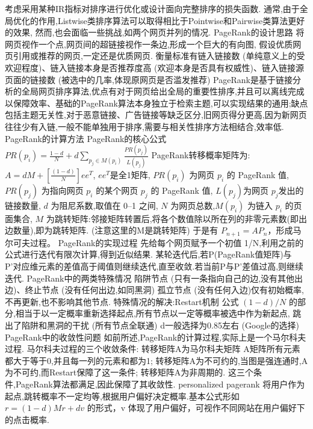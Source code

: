 \documentclass[10pt, utf8]{ctexart}
\begin{document}
\begin{multicols}{4}
    考虑采用某种IR指标对排序进行优化或设计面向完整排序的损失函数.
    通常,由于全局优化的作用,Listwise类排序算法可以取得相比于Pointwise和Pairwise类算法更好的效果,
    然而,也会面临一些挑战,如两个网页并列的情况.
    {\color{blue}PageRank的设计思路}
    将网页视作一个点,网页间的超链接视作一条边,形成一个巨大的有向图,
    假设优质网页引用或推荐的网页,一定还是优质网页.
    衡量标准有链入链接数 (单纯意义上的受欢迎程度)、链入链接本身是否推荐度高 (欢迎本身是否具有权威性)、链入链接源页面的链接数 (被选中的几率,体现原网页是否滥发推荐)
    PageRank是基于链接分析的全局网页排序算法,优点有对于网页给出全局的重要性排序,并且可以离线完成以保障效率、基础的PageRank算法本身独立于检索主题,可以实现结果的通用;缺点包括主题无关性,对于恶意链接、广告链接等缺乏区分,旧网页得分更高,因为新网页往往少有入链,一般不能单独用于排序,需要与相关性排序方法相结合,效率低.
    {\color{red}PageRank的计算方法}
    PageRank的核心公式
    {\tiny${PR}(p_{i})=\frac{1-d}{N}+d \sum_{p_{j} \in M(p_{i})} \frac{PR(p_{j})}{L(p_{j})}$}
    PageRank转移概率矩阵为:{\tiny$A =dM+\left[\frac{(1-d)}{N}\right]ee^{T}$}, $e e^{T}$是全1矩阵,
    $PR(p_i)$ 为网页 $p_i$ 的 PageRank 值,
    $PR(p_j)$ 为指向网页 $p_i$ 的某个网页 $p_j$ 的 PageRank 值,
    $L(p_j)$为网页 $p_j$发出的链接数量,
    $d$ 为阻尼系数,取值在 0--1 之间,
    $N$ 为网页总数,$M(p_i)$ 为链入 $p_i$ 的页面集合,
    $M$ 为跳转矩阵:邻接矩阵转置后,将各个数值除以所在列的非零元素数(即出边数量),即为跳转矩阵.
    ({\color{red}注意这里的M是跳转矩阵})
    于是有 $P_{n+1} = AP_n$，形成马尔可夫过程。
    {\color{blue}PageRank的实现过程}
    先给每个网页赋予一个初值 1/N,利用之前的公式进行迭代有限次计算,得到近似结果.
    某轮迭代后,若P(PageRank值矩阵)与P'对应维元素的差值高于阈值则继续迭代,直至收敛.若当前P与P'差值过高,则继续迭代.
    {\color{blue}PageRank中的两类特殊情况}
    陷阱节点 (只有一条指向自己的边,没有其他出边)、终止节点 (没有任何出边,如同黑洞)
    孤立节点 (没有任何入边)仅有初始概率,不再更新,也不影响其他节点.
    {\color{blue}特殊情况的解决:Restart机制}
    公式 $(1-d)/N$ 的部分,相当于以一定概率重新选择起点,所有节点以一定等概率被选中作为新起点,
    跳出了陷阱和黑洞的干扰 (所有节点全联通)
    d一般选择为0.85左右 (Google的选择)
    {\color{blue}PageRank中的收敛性问题}
    如前所述,PageRank的计算过程,实际上是一个马尔科夫过程.
    马尔科夫过程的三个收敛条件:
    转移矩阵A为马尔科夫矩阵 A矩阵所有元素都大于等于0,并且每一列的元素和都为1;
    转移矩阵A为不可约的,当图是强连通时,A为不可约,而Restart保障了这一条件;
    转移矩阵A为非周期的.
    这三个条件,PageRank算法都满足,因此保障了其收敛性.
    {\color{blue}personalized pagerank}
    将用户作为起点,跳转概率不一定均等,根据用户偏好决定概率.基本公式形如 $r = (1-d)Mr + dv$ 的形式，v 体现了用户偏好，可视作不同网站在用户偏好下的点击概率.

\end{multicols}
\end{document}
